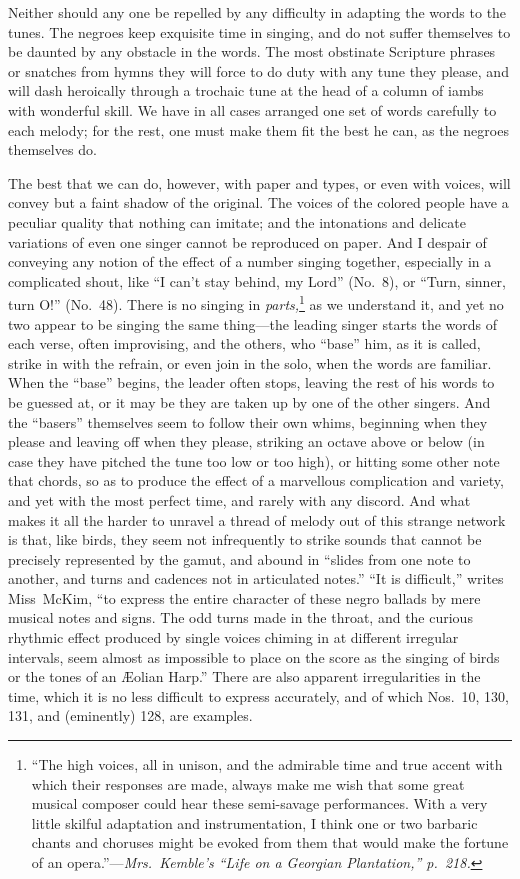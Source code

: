 \documentclass[a5paper,10pt]{book}
\begin{document}
Neither should any one be repelled by any difficulty in adapting the
words to the tunes.  The negroes keep exquisite time in singing, and
do not suffer themselves to be daunted by any obstacle in the words.
The most obstinate Scripture phrases or snatches from hymns they will
force to do duty with any tune they please, and will dash heroically
through a trochaic tune at the head of a column of iambs with
wonderful skill.  We have in all cases arranged one set of words
carefully to each melody; for the rest, one must make them fit the
best he can, as the negroes themselves do.

The best that we can do, however, with paper and types, or even with
voices, will convey but a faint shadow of the original.  The voices of
the colored people have a peculiar quality that nothing can imitate;
and the intonations and delicate variations of even one singer cannot
be reproduced on paper.  And I despair of conveying any notion of the
effect of a number singing together, especially in a complicated
shout, like ``I can't stay behind, my Lord'' (No.~8), or ``Turn,
sinner, turn O!'' (No.~48).  There is no singing in
\emph{parts,}\footnote{``The high voices, all in unison, and the
admirable time and true accent with which their responses are made,
always make me wish that some great musical composer could hear these
semi-savage performances.  With a very little skilful adaptation and
instrumentation, I think one or two barbaric chants and choruses might
be evoked from them that would make the fortune of an
opera.''---\emph{Mrs.~Kemble's ``Life on a Georgian Plantation,''
p.~218.}} as we understand it, and yet no two appear to be singing the
same thing---the leading singer starts the words of each verse, often
improvising, and the others, who ``base'' him, as it is called, strike
in with the refrain, or even join in the solo, when the words are
familiar.  When the ``base'' begins, the leader often stops, leaving
the rest of his words to be guessed at, or it may be they are taken up
by one of the other singers.  And the ``basers'' themselves seem to
follow their own whims, beginning when they please and leaving off
when they please, striking an octave above or below (in case they have
pitched the tune too low or too high), or hitting some other note that
chords, so as to produce the effect of a marvellous complication and
variety, and yet with the most perfect time, and rarely with any
discord.  And what makes it all the harder to unravel a thread of
melody out of this strange network is that, like birds, they seem not
infrequently to strike sounds that cannot be precisely represented by
the gamut, and abound in ``slides from one note to another, and turns
and cadences not in articulated notes.''  ``It is difficult,'' writes
Miss~McKim, ``to express the entire character of these negro ballads
by mere musical notes and signs.  The odd turns made in the throat,
and the curious rhythmic effect produced by single voices chiming in
at different irregular intervals, seem almost as impossible to place
on the score as the singing of birds or the tones of an \AE{}olian
Harp.''  There are also apparent irregularities in the time, which it
is no less difficult to express accurately, and of which Nos.~10, 130,
131, and (eminently) 128, are examples.
\end{document}
